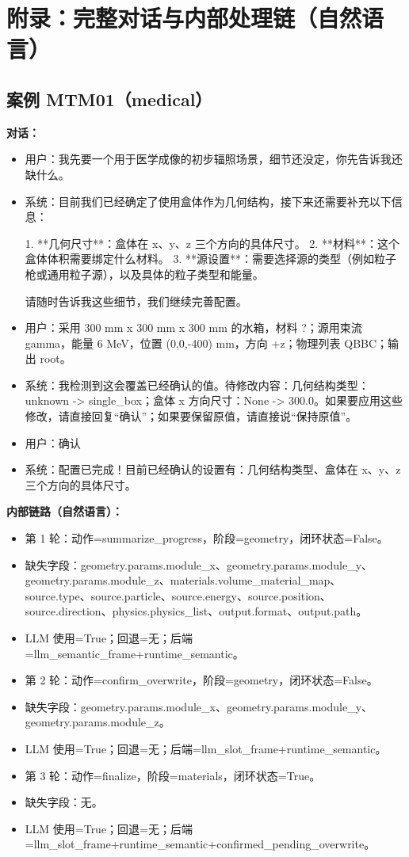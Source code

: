 \documentclass[11pt]{ctexart}
\begin{document}
\section{附录：完整对话与内部处理链（自然语言）}
\subsection{案例 MTM01（medical）}
\textbf{对话：}
\begin{itemize}
\item 用户：我先要一个用于医学成像的初步辐照场景，细节还没定，你先告诉我还缺什么。
\item 系统：目前我们已经确定了使用盒体作为几何结构，接下来还需要补充以下信息：

1.  **几何尺寸**：盒体在 x、y、z 三个方向的具体尺寸。
2.  **材料**：这个盒体体积需要绑定什么材料。
3.  **源设置**：需要选择源的类型（例如粒子枪或通用粒子源），以及具体的粒子类型和能量。

请随时告诉我这些细节，我们继续完善配置。
\item 用户：采用 300 mm x 300 mm x 300 mm 的水箱，材料 ?；源用束流 gamma，能量 6 MeV，位置 (0,0,-400) mm，方向 +z；物理列表 QBBC；输出 root。
\item 系统：我检测到这会覆盖已经确认的值。待修改内容：几何结构类型：unknown -> single\_box；盒体 x 方向尺寸：None -> 300.0。如果要应用这些修改，请直接回复“确认”；如果要保留原值，请直接说“保持原值”。
\item 用户：确认
\item 系统：配置已完成！目前已经确认的设置有：几何结构类型、盒体在 x、y、z 三个方向的具体尺寸。
\end{itemize}
\textbf{内部链路（自然语言）：}
\begin{itemize}
\item 第 1 轮：动作=summarize\_progress，阶段=geometry，闭环状态=False。
\item 缺失字段：geometry.params.module\_x、geometry.params.module\_y、geometry.params.module\_z、materials.volume\_material\_map、source.type、source.particle、source.energy、source.position、source.direction、physics.physics\_list、output.format、output.path。
\item LLM 使用=True；回退=无；后端=llm\_semantic\_frame+runtime\_semantic。
\item 第 2 轮：动作=confirm\_overwrite，阶段=geometry，闭环状态=False。
\item 缺失字段：geometry.params.module\_x、geometry.params.module\_y、geometry.params.module\_z。
\item LLM 使用=True；回退=无；后端=llm\_slot\_frame+runtime\_semantic。
\item 第 3 轮：动作=finalize，阶段=materials，闭环状态=True。
\item 缺失字段：无。
\item LLM 使用=True；回退=无；后端=llm\_slot\_frame+runtime\_semantic+confirmed\_pending\_overwrite。
\end{itemize}
\end{document}
